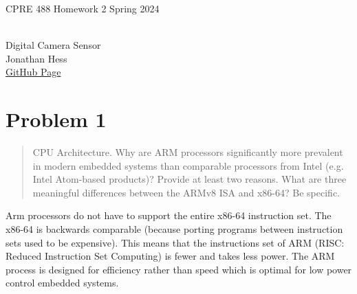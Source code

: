 \documentclass[10pt,a4paper]{article}
\author{}
\date{}
\begin{document}
\begin{flushleft}
\begin{LARGE}CPRE 488 Homework 2 Spring 2024
\end{LARGE}
\\Digital Camera Sensor
\\Jonathan Hess
\\\href{https://github.com/Jetsama/CPRE488/tree/main/HW2}{GitHub Page}
\end{flushleft}

\section{Problem 1}
\begin{quote}
CPU Architecture. Why are ARM processors significantly more prevalent in modern embedded systems than
comparable processors from Intel (e.g. Intel Atom-based products)? Provide at least two reasons. What are
three meaningful differences between the ARMv8 ISA and x86-64? Be specific.
\end{quote}

Arm processors do not have to support the entire x86-64 instruction set. The x86-64 is backwards comparable (because porting programs between instruction sets used to be expensive). This means that the instructions set of ARM (RISC: Reduced Instruction Set Computing) is fewer and takes less power. The ARM process is designed for efficiency rather than speed which is optimal for low power control embedded systems.
\end{document}
